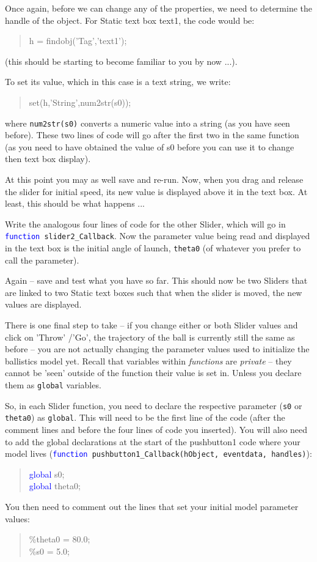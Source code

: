 \documentclass{tufte-book} %
\newenvironment{docspec}{\begin{quotation}\ttfamily\parskip0pt\parindent0pt\ignorespaces}{\end{quotation}}
\begin{document}
Once again, before we can change any of the properties, we need to determine the handle of the object. For \textsf{Static text} box \textsf{text1}, the code would be:
\begin{docspec}
h = findobj(\textcolor[rgb]{0.501961,0,1}{'Tag'},\textcolor[rgb]{0.501961,0,1}{'text1'});
\end{docspec}
(this should be starting to become familiar to you by now ...).

To set its value, which in this case is a text string, we write:
\begin{docspec}
set(h,\textcolor[rgb]{0.501961,0,1}{'String'},num2str(s0));
\end{docspec}
where \texttt{num2str(s0)} converts a numeric value into a string (as you have seen before). These two lines of code will go after the first two in the same function (as you need to have obtained the value of s0 before you can use it to change then text box display).

At this point you may as well save and re-run. Now, when you drag and release the slider for initial speed, its new value is displayed above it in the text box. At least, this should be what happens ...

Write the analogous four lines of code for the other Slider, which will go in \texttt{\textcolor{blue}{function} slider2\_Callback}. Now the parameter value being read and displayed in the text box is the initial angle of launch, \texttt{theta0} (of whatever you prefer to call the parameter).

Again -- save and test what you have so far. This should now be two \textsf{Sliders} that are linked to two \textsf{Static text} boxes such that when the slider is moved, the new values are displayed. 

There is one final step to take -- if you change either or both \textsf{Slider} values and click on 'Throw' /'Go', the trajectory of the ball is currently still the same as before -- you are not actually changing the parameter values used to initialize the ballistics model yet. Recall that variables within \textit{functions} are \textit{private} -- they cannot be 'seen' outside of the function their value is set in. Unless you declare them as \texttt{global} variables.

So, in each \textsf{Slider} function, you need to declare the respective parameter (\texttt{s0} or \texttt{theta0}) as \texttt{global}. This will need to be the first line of the code (after the comment lines and before the four lines of code you inserted). You will also need to add the global declarations at the start of the \textsf{pushbutton1} code where your model lives (\texttt{\textcolor{blue}{function} pushbutton1\_Callback(hObject, eventdata, handles)}):
\begin{docspec}
\textcolor{blue}{global} s0;
\\\textcolor{blue}{global} theta0;
\end{docspec}
You then need to comment out the lines that set your initial model parameter values:
\begin{docspec}
\textcolor[rgb]{0,0.501961,0}{\%theta0 = 80.0;
\\\%s0 = 5.0;}
\end{docspec}
\end{document}
